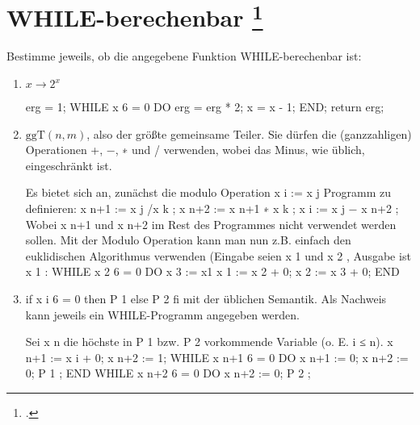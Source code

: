 \documentclass{lehramt-informatik-aufgabe}
\begin{document}
\section{WHILE-berechenbar
\footcite[Aufgabe 2]{theo:ab:4}}

Bestimme jeweils, ob die angegebene Funktion WHILE-berechenbar ist:

\begin{enumerate}


\item $x \rightarrow 2^x$

\begin{liAntwort}
erg = 1;
WHILE x 6 = 0 DO
erg = erg * 2;
x = x - 1;
END;
return erg;
\end{liAntwort}


\item $\text{ggT}(n, m)$,
also der größte gemeinsame Teiler. Sie dürfen die (ganzzahligen) Operationen
+, −, ∗ und / verwenden, wobei das Minus, wie üblich, eingeschränkt ist.

\begin{liAntwort}
Es bietet sich an, zunächst die modulo Operation x i := x j %
Programm zu definieren:
x n+1 := x j /x k ;
x n+2 := x n+1 ∗ x k ;
x i := x j − x n+2 ;
Wobei x n+1 und x n+2 im Rest des Programmes nicht verwendet werden sollen. Mit der
Modulo Operation kann man nun z.B. einfach den euklidischen Algorithmus verwenden
(Eingabe seien x 1 und x 2 , Ausgabe ist x 1 :
WHILE x 2 6 = 0 DO
x 3 := x1 %
x 1 := x 2 + 0;
x 2 := x 3 + 0;
END
\end{liAntwort}


\item if x i 6 = 0 then P 1 else P 2 fi mit der üblichen Semantik.
Als Nachweis kann jeweils ein WHILE-Programm angegeben werden.

\begin{liAntwort}
Sei x n die höchste in P 1 bzw. P 2 vorkommende Variable (o. E. i ≤ n).
x n+1 := x i + 0;
x n+2 := 1;
WHILE x n+1 6 = 0 DO
x n+1 := 0;
x n+2 := 0;
P 1 ;
END
WHILE x n+2 6 = 0 DO
x n+2 := 0;
P 2 ;
\end{liAntwort}

\end{enumerate}
\end{document}

